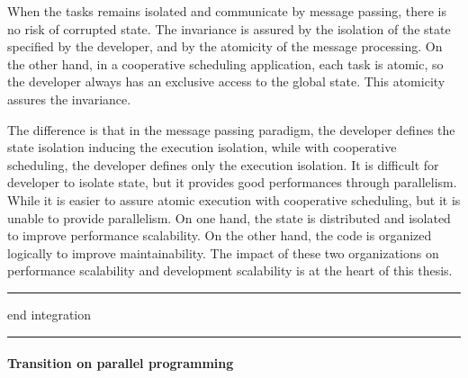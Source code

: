 When the tasks remains isolated and communicate by message passing, there is no risk of corrupted state.
The invariance is assured by the isolation of the state specified by the developer, and by the atomicity of the message processing.
On the other hand, in a cooperative scheduling application, each task is atomic, so the developer always has an exclusive access to the global state.
This atomicity assures the invariance.


The difference is that in the message passing paradigm, the developer defines the state isolation inducing the execution isolation, while with cooperative scheduling, the developer defines only the execution isolation.
It is difficult for developer to isolate state, but it provides good performances through parallelism.
While it is easier to assure atomic execution with cooperative scheduling, but it is unable to provide parallelism.
On one hand, the state is distributed and isolated to improve performance scalability.
On the other hand, the code is organized logically to improve maintainability.
The impact of these two organizations on performance scalability and development scalability is at the heart of this thesis.

\begin{center}
\rule{3cm}{0.4pt}
end integration
\rule{3cm}{0.4pt}
\end{center}



\paragraph{Transition on parallel programming}


